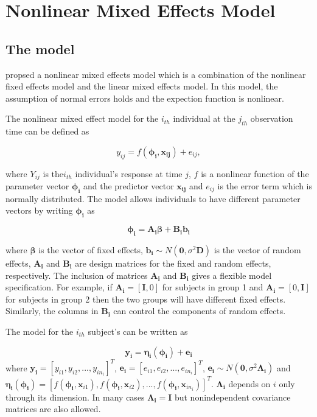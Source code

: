 \documentclass{article}
\numberwithin{equation}{section}
\begin{document}
	
\section{Nonlinear Mixed Effects Model}

\subsection{The model}
\cite{lindstrom1990nonlinear} propsed a nonlinear mixed effects model which is a combination of the nonlinear fixed effects model and the linear mixed effects model. In this model, the assumption of normal errors holds and the expection function is nonlinear.

The nonlinear mixed effect model for the $i_{th}$ individual at the $j_{th}$ observation time can be defined as

\begin{equation}
y_{ij} = f(\bm{\phi_i},\bm{x_{ij}})+e_{ij},
\end{equation}

where $Y_{ij}$ is the$i_{th}$ individual's response at time $j$, $f$ is a nonlinear function of the parameter vector $\bm{\phi_i}$ and the predictor vector $\bm{x_{ij}}$ and $e_{ij}$ is the error term which is normally distributed. The model allows individuals to have different parameter vectors by writing $\bm{\phi_i}$ as

\begin{equation}
\bm{\phi_i} = \bm{A_i}\bm{\beta}+\bm{B_i}\bm{b_i}
\end{equation}

where $\bm{\beta}$ is the vector of fixed effects, $\bm{b_i} \sim N(\bm{0}, \sigma^2 \bm{D})$ is the vector of random effects, $\bm{A_i}$ and $\bm{B_i}$ are design matrices for the fixed and random effects, respectively. The inclusion of matrices  $\bm{A_i}$ and $\bm{B_i}$ gives a flexible model specification. For example, if $\bm{A_i} = [\bm{\text{I}},0]$ for subjects in group 1 and $\bm{A_i} = [0,\bm{\text{I}}]$ for subjects in group 2 then the two groups will have different fixed effects. Similarly, the columns in $\bm{B_i}$ can control the components of random effects.

The model for the $i_{th}$ subject's can be written as 

\begin{equation}
\bm{y_i} = \bm{\eta_i(\bm{\phi_i})} + \bm{e_i}
\end{equation}
where $\bm{y_i}= [y_{i1},y_{i2},...,y_{in_i}]^T$, $\bm{e_i}=[e_{i1},e_{i2},...,e_{in_i}]^T$, $\bm{e_i} \sim N(\bm{0}, \sigma^2 \bm{\Lambda_i})$ and $\bm{\eta_i(\phi_i)}= [f(\bm{\phi_i},\bm{x}_{i1}), f(\bm{\phi_i},\bm{x}_{i2}),...,f(\bm{\phi_i},\bm{x}_{in_i})]^T$. $\bm{\Lambda_i}$ depends on $i$ only through its dimension. In many cases $\bm{\Lambda_i} = \bm{\text{I}}$ but nonindependent covariance matrices are also allowed. 
\end{document}
